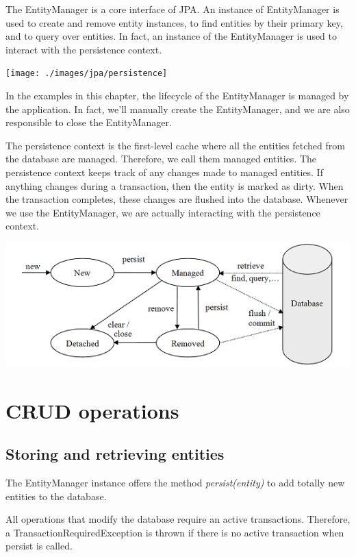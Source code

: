 The EntityManager is a core interface of JPA.  An instance of EntityManager is used to create and remove  entity instances, to find entities by their primary key,  and to query over entities.  In fact,  an instance of the EntityManager is used to interact with the persistence context. 

\texttt{[image: ./images/jpa/persistence]}

In the examples in this chapter, the lifecycle of the EntityManager is managed by the application.
In fact, we'll manually create the EntityManager,  and we are also responsible to close the EntityManager.

The persistence context is the first-level cache where all the entities fetched from the database are managed.  Therefore, we call them managed entities.  The persistence context keeps track of any changes made to managed entities. If anything changes during a transaction, then the entity is marked as dirty. When the transaction completes, these changes are flushed into the database.
Whenever we use the EntityManager, we are actually interacting with the persistence context.

\includegraphics[width=\textwidth]{./images/jpa/entity_states}


\section{CRUD operations}

\subsection{Storing and retrieving entities}

The EntityManager instance offers the method \textit{persist(entity)} to add totally new entities to the database.

All operations that modify the database require an active transactions. Therefore, a TransactionRequiredException is thrown if there is no active transaction when persist is called.

